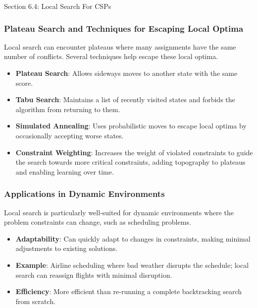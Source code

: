 \begin{notes}{Section 6.4: Local Search For CSPs}
\begin{highlight}
    \end{highlight}
    
    \subsubsection*{Plateau Search and Techniques for Escaping Local Optima}
    
    Local search can encounter plateaus where many assignments have the same number of conflicts. Several techniques help escape these local optima.
    
    \begin{highlight}
    
        \begin{itemize}
            \item \textbf{Plateau Search}: Allows sideways moves to another state with the same score.
            \item \textbf{Tabu Search}: Maintains a list of recently visited states and forbids the algorithm from returning to them.
            \item \textbf{Simulated Annealing}: Uses probabilistic moves to escape local optima by occasionally accepting worse states.
            \item \textbf{Constraint Weighting}: Increases the weight of violated constraints to guide the search towards more critical constraints, adding topography to plateaus and enabling learning over time.
        \end{itemize}
    
    \end{highlight}
    
    \subsubsection*{Applications in Dynamic Environments}
    
    Local search is particularly well-suited for dynamic environments where the problem constraints can change, such as scheduling problems.
    
    \begin{highlight}
    
        \begin{itemize}
            \item \textbf{Adaptability}: Can quickly adapt to changes in constraints, making minimal adjustments to existing solutions.
            \item \textbf{Example}: Airline scheduling where bad weather disrupts the schedule; local search can reassign flights with minimal disruption.
            \item \textbf{Efficiency}: More efficient than re-running a complete backtracking search from scratch.
        \end{itemize}
    

\end{highlight}
\end{notes}
